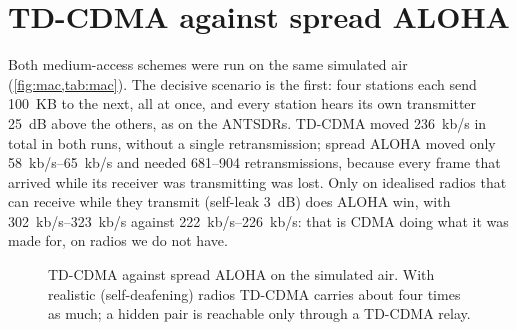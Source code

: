 \documentclass[11pt,a4paper,oneside]{report}
\begin{document}
\section{TD-CDMA against spread ALOHA}\label{sec:vsaloha}
Both medium-access schemes were run on the same simulated air (\cref{fig:mac,tab:mac}). The decisive
scenario is the first: four stations each send \SI{100}{KB} to the next, all at once, and every station
hears its own transmitter \SI{25}{dB} above the others, as on the ANTSDRs. TD-CDMA moved
\SI{236}{kb/s} in total in both runs, without a single retransmission; spread ALOHA moved only
\SIrange{58}{65}{kb/s} and needed 681--904 retransmissions, because every frame that arrived while its
receiver was transmitting was lost. Only on idealised radios that can receive while they transmit
(self-leak \SI{3}{dB}) does ALOHA win, with \SIrange{302}{323}{kb/s} against \SIrange{222}{226}{kb/s}:
that is CDMA doing what it was made for, on radios we do not have.

\begin{figure}[htbp]
\centering
{}
\caption{TD-CDMA against spread ALOHA on the simulated air. With realistic (self-deafening) radios
TD-CDMA carries about four times as much; a hidden pair is reachable only through a TD-CDMA relay.}\label{fig:mac}
\end{figure}
\end{document}
